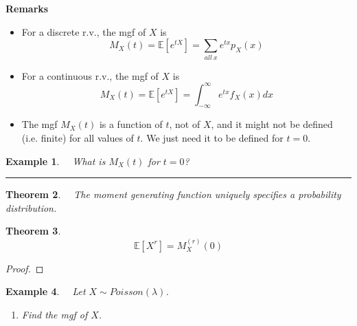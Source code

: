 \documentclass[12pt]{amsart}
\newtheorem{theorem}{Theorem}[section]
\newtheorem{example}[theorem]{Example}
\newcommand\Ebb{\mathbb{E}}
\newcommand\gl{\lambda}
\newcommand\pmfX{p_X(x)}
\newcommand\pdfX{f_X(x)}
\newcommand\mgfX{M_X(t)}
\newcommand\intinft{\int_{-\infty}^{\infty}}
\begin{document}
{\vspace{1cm}
\textbf{Remarks} 

\begin{itemize}
\item For a discrete r.v., the mgf of $X$ is
$$
\mgfX = \Ebb[e^{tX}]=\sum_{all \ x}e^{tx}\pmfX
$$
\vspace{.5cm}
\item For a continuous r.v., the mgf of $X$ is
$$
\mgfX = \Ebb[e^{tX}]=\intinft e^{tx}\pdfX dx
$$

\vspace{.5cm}
\item The mgf $\mgfX$ is a function of $t$, not of $X$, and it might not be defined (i.e. finite) for all values of $t$. We just need it to be defined for $t=0$.
\end{itemize}


\newpage

\begin{example} \ \  What is $\mgfX$ for $t=0$?
\end{example}


\vspace{5cm}
\hrule
\vspace{.5cm}

\begin{theorem} \ \  The moment generating function uniquely specifies a probability distribution.
\end{theorem}

\vspace{.5cm}

\begin{theorem} \ \  
$$
\Ebb[X^r] = M_X^{(r)}(0)
$$
\end{theorem}

\begin{proof}
\end{proof}



\newpage

\begin{example} \ \  Let $X \sim Poisson(\gl)$. 

\begin{enumerate}
\item Find the mgf of $X$.


\end{enumerate}
\end{example}}
\end{document}
